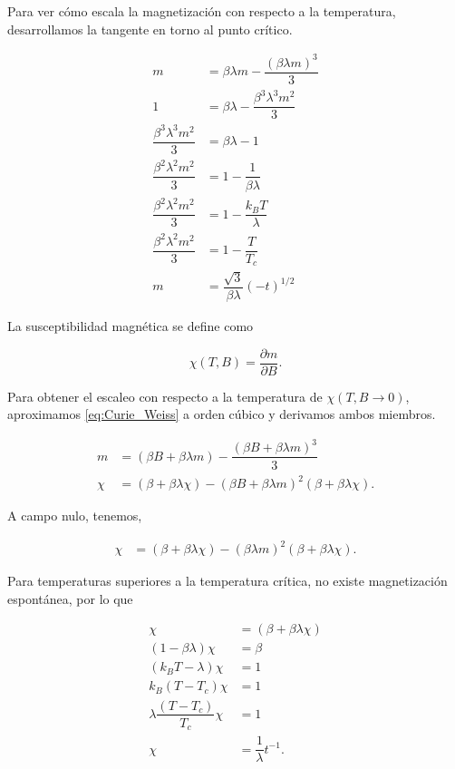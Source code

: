 \documentclass[10pt]{article}
\begin{document}
Para ver c\'omo escala la magnetizaci\'on con respecto a la temperatura, desarrollamos la tangente en torno al punto cr\'itico.

\begin{align}
m &= \beta \lambda m - \dfrac{(\beta \lambda m)^3}{3} \nonumber \\
1 &= \beta \lambda - \dfrac{\beta^3 \lambda^3 m^2}{3}\nonumber \\
\dfrac{\beta^3 \lambda^3 m^2}{3} &= \beta \lambda - 1\nonumber \\
\dfrac{\beta^2 \lambda^2 m^2}{3} &= 1- \dfrac{1}{\beta \lambda}\nonumber \\
\dfrac{\beta^2 \lambda^2 m^2}{3} &= 1- \dfrac{k_B T}{ \lambda} \nonumber\\
\dfrac{\beta^2 \lambda^2 m^2}{3} &= 1- \dfrac{T}{ T_c}\nonumber \\
m &= \dfrac{\sqrt{3}}{\beta \lambda} (-t)^{1/2} \label{eq:m_function_t}
\end{align}

La susceptibilidad magn\'etica se define como 

\begin{equation}
\chi(T, B) = \dfrac{\partial m}{\partial B}.
\end{equation}

Para obtener el escaleo con respecto a la temperatura de $\chi(T, B\rightarrow 0)$, aproximamos \ref{eq:Curie_Weiss} a orden c\'ubico y derivamos ambos miembros.

\begin{align}
m &= (\beta B + \beta \lambda m) - \dfrac{(\beta B + \beta \lambda m)^3}{3} \nonumber \\
\chi &= (\beta + \beta \lambda \chi) - (\beta B + \beta \lambda m)^2 (\beta + \beta \lambda \chi). 
\end{align}

A campo nulo, tenemos,

\begin{align}
\chi &= (\beta + \beta \lambda \chi) - (\beta \lambda m)^2 (\beta + \beta \lambda \chi). 
\end{align}

Para temperaturas superiores a la temperatura cr\'itica, no existe magnetizaci\'on espont\'anea, por lo que 

\begin{align}
\chi &= (\beta + \beta \lambda \chi) \nonumber \\
(1 - \beta \lambda )\chi &= \beta  \nonumber  \\
(k_B T - \lambda )\chi &= 1  \nonumber  \\
k_B (T -T_c )\chi &= 1 \nonumber   \\
\lambda \dfrac{(T -T_c )}{T_c}\chi &= 1  \nonumber  \\
\chi &= \dfrac{1}{\lambda} t^{-1}.
\end{align}
\end{document}
